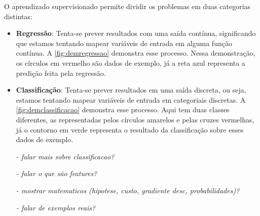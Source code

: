 O aprendizado supervisionado permite dividir os problemas em duas categorias distintas:


\begin{itemize}
	\item \textbf{Regressão}: Tenta-se prever resultados com uma saída contínua, significando que estamos tentando mapear variáveis de entrada em alguma função contínua. A \autoref{fig:demregressao} demonstra esse processo. Nessa demonstração, os círculos em vermelho são dados de exemplo, já a reta azul representa a predição feita pela regressão.
	\item \textbf{Classificação}:  Tenta-se prever resultados em uma saída discreta, ou seja, estamos tentando mapear variáveis de entrada em categoriais discretas. A \autoref{fig:demclassificacao} demonstra esse processo. Aqui tem duas classes diferentes, as representadas pelos círculos amarelos e pelas cruzes vermelhas, já o contorno em verde representa o resultado da classificação sobre esses dados de exemplo.


	\textit{- falar mais sobre classificacao?} 

	\textit{- falar o que são features?}

	\textit{- mostrar matematicos (hipotese, custo, gradiente desc, probabilidades)?}

	\textit{- falar de exemplos reais?}


\end{itemize}


